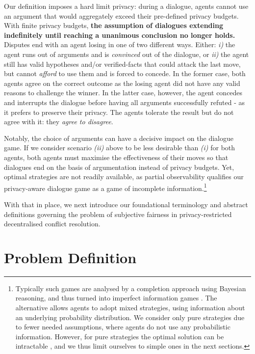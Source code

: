 \documentclass[acmsmall]{custom-arxiv}  %
\begin{document}
Our definition imposes a hard limit privacy: during a dialogue, agents cannot use an argument that would aggregately exceed their pre-defined privacy budgets. With finite privacy budgets, \textbf{the assumption of dialogues extending indefinitely until reaching a unanimous conclusion no longer holds.} Disputes end with an agent losing in one of two different ways. Either: \textit{i)} the agent runs out of arguments and is \textit{convinced} out of the dialogue, or \textit{ii)} the agent still has valid hypotheses and/or verified-facts that could attack the last move, but cannot \textit{afford} to use them and is forced to concede. In the former case, both agents agree on the correct outcome as the losing agent did not have any valid reasons to challenge the winner. In the latter case, however, the agent concedes and interrupts the dialogue before having all arguments successfully refuted - as it prefers to preserve their privacy. The agents tolerate the result but do not agree with it: they \textit{agree to disagree}. 

Notably, the choice of arguments can have a decisive impact on the dialogue game. If we consider scenario \textit{(ii)} above to be less desirable than \textit{(i)} for both agents, both agents must maximise the effectiveness of their moves so that dialogues end on the basis of argumentation instead of privacy budgets. Yet, optimal strategies are not readily available, as partial observability qualifies our privacy-aware dialogue game as a game of incomplete information.\footnote{Typically such games are analysed by a completion approach using Bayesian reasoning, and thus turned into imperfect information games \citep{Binmore1992FunGames}. The alternative allows agents to adopt mixed strategies, using information about an underlying probability distribution. We consider only pure strategies due to fewer needed assumptions, where agents do not use any probabilistic information. However, for pure strategies the optimal solution can be intractable \citep{Blair1993GamesInformation,Reif1984TheInformation}, and we thus limit ourselves to simple ones in the next sections.} 

With that in place, we next introduce our foundational terminology and abstract definitions governing the problem of subjective fairness in privacy-restricted decentralised conflict resolution.




\section{Problem Definition}
\label{section:fairness}
\end{document}
